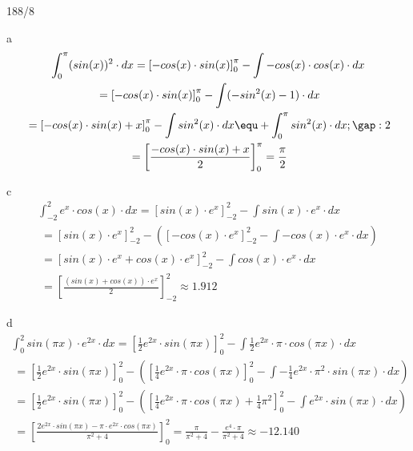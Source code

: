 \begin{exercise}{188/8}
  \item [a]
  \begin{gather*}
    \int_0^\pi (sin(x))^2 \cdot dx = \left[-cos(x) \cdot sin(x)\right]_0^\pi - \int -cos(x) \cdot cos(x) \cdot dx \\
    \;= \left[-cos(x) \cdot sin(x)\right]_0^\pi - \int (-sin^2(x) - 1) \cdot dx \\
    \;= \left[-cos(x) \cdot sin(x) + x\right]_0^\pi - \int sin^2(x) \cdot dx \equ + \int_0^\pi sin^2(x) \cdot dx; \gap : 2 \\
    \;= \left[\frac{-cos(x) \cdot sin(x) + x}{2}\right]_0^\pi = \frac{\pi}{2}
  \end{gather*}
  \item [c]
  \begin{gather*}
    \int_{-2}^2 e^x \cdot cos(x) \cdot dx = \left[sin(x) \cdot e^x\right]_{-2}^2 - \int sin(x) \cdot e^x \cdot dx \\
    \;= \left[sin(x) \cdot e^x\right]_{-2}^2 - (\left[-cos(x) \cdot e^x\right]_{-2}^2 - \int -cos(x) \cdot e^x \cdot dx) \\
    \;= \left[sin(x) \cdot e^x + cos(x) \cdot e^x\right]_{-2}^2 - \int cos(x) \cdot e^x \cdot dx \\
    \;= \left[\frac{(sin(x) + cos(x)) \cdot e^x}{2}\right]_{-2}^2 \approx 1.912
  \end{gather*}
  \item [d]
  \begin{gather*}
    \int_0^2 sin(\pi x) \cdot e^{2x} \cdot dx = \left[\frac{1}{2}e^{2x} \cdot sin(\pi x)\right]_0^2 - \int \frac{1}{2}e^{2x} \cdot \pi \cdot cos(\pi x) \cdot dx \\
    \;= \left[\frac{1}{2}e^{2x} \cdot sin(\pi x)\right]_0^2 - (\left[\frac{1}{4}e^{2x} \cdot \pi \cdot cos(\pi x)\right]_0^2 - \int -\frac{1}{4}e^{2x} \cdot \pi^2 \cdot sin(\pi x) \cdot dx) \\
    \;= \left[\frac{1}{2}e^{2x} \cdot sin(\pi x)\right]_0^2 - (\left[\frac{1}{4}e^{2x} \cdot \pi \cdot cos(\pi x) + \frac{1}{4}\pi^2\right]_0^2 - \int e^{2x} \cdot sin(\pi x) \cdot dx) \\
    \;= \left[\frac{2e^{2x} \cdot sin(\pi x) - \pi \cdot e^{2x} \cdot cos(\pi x)}{\pi^2 + 4}\right]_0^2 = \frac{\pi}{\pi^2 + 4} - \frac{e^4 \cdot \pi}{\pi^2 + 4} \approx -12.140
  \end{gather*}
\end{exercise}
